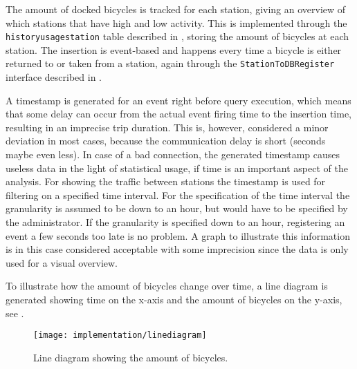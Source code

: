 The amount of docked bicycles is tracked for each station, giving an overview of which stations that have high and low activity.
This is implemented through the \texttt{historyusagestation} table described in , storing the amount of bicycles at each station.
The insertion is event-based and happens every time a bicycle is either returned to or taken from a station, again through the \texttt{StationToDBRegister} interface described in .

A timestamp is generated for an event right before query execution, which means that some delay can occur from the actual event firing time to the insertion time, resulting in an imprecise trip duration. 
This is, however, considered a minor deviation in most cases, because the communication delay is short (seconds maybe even less).
In case of a bad connection, the generated timestamp causes useless data in the light of statistical usage, if time is an important aspect of the analysis.
For showing the traffic between stations the timestamp is used for filtering on a specified time interval.
For the specification of the time interval the granularity is assumed to be down to an hour, but would have to be specified by the administrator.
If the granularity is specified down to an hour, registering an event a few seconds too late is no problem.
A graph to illustrate this information is in this case considered acceptable with some imprecision since the data is only used for a visual overview.

To illustrate how the amount of bicycles change over time, a line diagram is generated showing time on the x-axis and the amount of bicycles on the y-axis, see .

\begin{figure}[h]
\centering
\texttt{[image: implementation/linediagram]}
\caption{Line diagram showing the amount of bicycles.}\label{fig:linediagram}
\end{figure}


